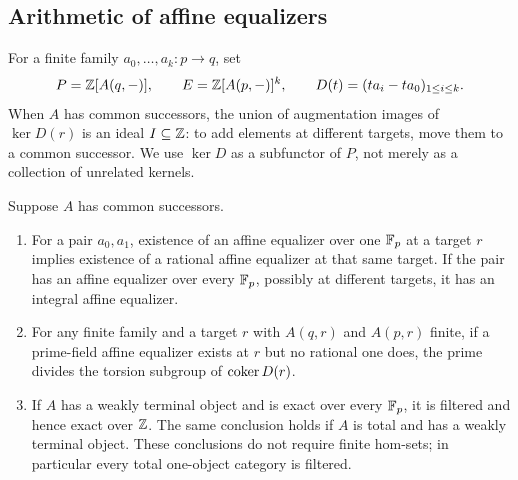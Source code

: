 \subsection{Arithmetic of affine equalizers}

For a finite family $a_0,\ldots,a_k:p\to q$, set
\[
 P=\mathbb Z[A(q,-)],\qquad E=\mathbb Z[A(p,-)]^k,\qquad
 D(t)=(ta_i-ta_0)_{1\leq i\leq k}.
\]
When $A$ has common successors, the union of augmentation images of $\ker D(r)$ is an ideal $I\subseteq\mathbb Z$: to add elements at different targets, move them to a common successor. We use $\ker D$ as a subfunctor of $P$, not merely as a collection of unrelated kernels.

\begin{proposition}\label{C:arithmetic-pairs}
Suppose $A$ has common successors.
\begin{enumerate}[label=(\alph*)]
\item For a pair $a_0,a_1$, existence of an affine equalizer over one $\mathbb F_p$ at a target $r$ implies existence of a rational affine equalizer at that same target. If the pair has an affine equalizer over every $\mathbb F_p$, possibly at different targets, it has an integral affine equalizer.
\item For any finite family and a target $r$ with $A(q,r)$ and $A(p,r)$ finite, if a prime-field affine equalizer exists at $r$ but no rational one does, the prime divides the torsion subgroup of $\operatorname{coker} D(r)$.
\item If $A$ has a weakly terminal object and is exact over every $\mathbb F_p$, it is filtered and hence exact over $\mathbb Z$. The same conclusion holds if $A$ is total and has a weakly terminal object. These conclusions do not require finite hom-sets; in particular every total one-object category is filtered.
\end{enumerate}
\end{proposition}
